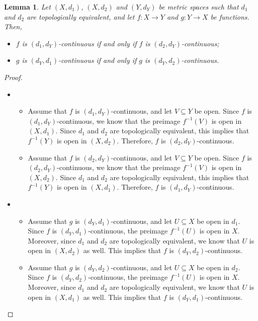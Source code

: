\documentclass[a4paper, openany]{memoir}
\theoremstyle{definition}
\theoremstyle{plain}
\newtheorem{lemma}[definition]{Lemma}
\begin{document}
\begin{lemma}
Let $(X, d_1)$, $(X, d_2)$ and $(Y, d_Y)$ be metric spaces such that $d_1$ and $d_2$ are topologically equivalent, and let $f: X \to Y$ and $g: Y \to X$ be functions. Then, 
\begin{itemize}
    \item $f$ is $(d_1, d_Y)$-continuous if and only if $f$ is $(d_2, d_Y)$-continuous;
    \item $g$ is $(d_Y, d_1)$-continuous if and only if $g$ is $(d_Y, d_2)$-continuous.
\end{itemize}
\end{lemma}
\begin{proof}
\hspace*{0pt}
\begin{itemize}
    \item \begin{itemize}
        \item Assume that $f$ is $(d_1, d_Y)$-continuous, and let $V \subseteq Y$ be open. Since $f$ is $(d_1, d_Y)$-continuous, we know that the preimage $f^{-1}(V)$ is open in $(X, d_1)$. Since $d_1$ and $d_2$ are topologically equivalent, this implies that $f^{-1}(Y)$ is open in $(X, d_2)$. Therefore, $f$ is $(d_2, d_Y)$-continuous.
        
        \item Assume that $f$ is $(d_2, d_Y)$-continuous, and let $V \subseteq Y$ be open. Since $f$ is $(d_2, d_Y)$-continuous, we know that the preimage $f^{-1}(V)$ is open in $(X, d_2)$. Since $d_1$ and $d_2$ are topologically equivalent, this implies that $f^{-1}(Y)$ is open in $(X, d_1)$. Therefore, $f$ is $(d_1, d_Y)$-continuous.
    \end{itemize}
    
    \item \begin{itemize}
        \item Assume that $g$ is $(d_Y, d_1)$-continuous, and let $U \subseteq X$ be open in $d_1$. Since $f$ is $(d_Y, d_1)$-continuous, the preimage $f^{-1}(U)$ is open in $X$. Moreover, since $d_1$ and $d_2$ are topologically equivalent, we know that $U$ is open in $(X, d_2)$ as well. This implies that $f$ is $(d_Y, d_2)$-continuous.
        
        \item Assume that $g$ is $(d_Y, d_2)$-continuous, and let $U \subseteq X$ be open in $d_2$. Since $f$ is $(d_Y, d_2)$-continuous, the preimage $f^{-1}(U)$ is open in $X$. Moreover, since $d_1$ and $d_2$ are topologically equivalent, we know that $U$ is open in $(X, d_1)$ as well. This implies that $f$ is $(d_Y, d_1)$-continuous.
    \end{itemize}
\end{itemize}
\end{proof}
\end{document}
